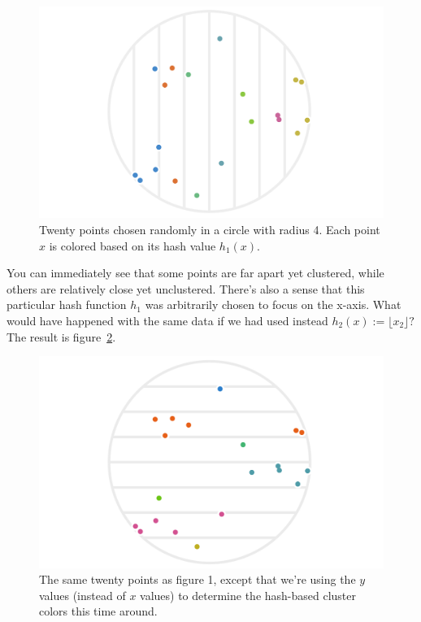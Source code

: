 \documentclass[20pt,]{extarticle}
\begin{document}
\begin{figure}
\centering
\includegraphics{images/lsh_image1_v2.png}
\caption{Twenty points chosen randomly in a circle with radius 4. Each
point \(x\) is colored based on its hash value
\(h_1(x).\)}\label{fig:fig1}
\end{figure}

You can immediately see that some points are far apart yet clustered,
while others are relatively close yet unclustered. There's also a sense
that this particular hash function \(h_1\) was arbitrarily chosen to
focus on the x-axis. What would have happened with the same data if we
had used instead \(h_2(x) := \lfloor x_2 \rfloor?\) The result is
figure~\ref{fig:fig2}.

\begin{figure}
\centering
\includegraphics{images/lsh_image2.png}
\caption{The same twenty points as figure 1, except that we're using the
\(y\) values (instead of \(x\) values) to determine the hash-based
cluster colors this time around.}\label{fig:fig2}
\end{figure}
\end{document}
